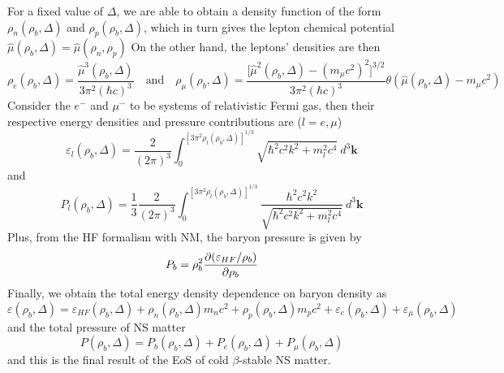 For a fixed value of $\Delta$, we are able to obtain a density function of the form $\rho_n (\rho_b, \Delta)$ and $\rho_p (\rho_b, \Delta)$, which in turn gives the lepton chemical potential $\hat{\mu}(\rho_b,\Delta) = \hat{\mu}(\rho_n,\rho_p)$ On the other hand, the leptons' densities are then
\begin{equation}
        \rho_e(\rho_b,\Delta) = \frac{ \hat{\mu}^3(\rho_b,\Delta)}{ 3\pi^2 (\hbar c)^3} \quad\text{and}\quad \rho_\mu(\rho_b,\Delta) = \frac{ \Big[\hat{\mu}^2(\rho_b,\Delta) - (m_\mu c^2)^2\Big]^{3/2}}{ 3\pi^2 (\hbar c)^3} \theta(\hat{\mu}(\rho_b,\Delta)-m_\mu c^2)
\end{equation} 
Consider the $e^-$ and $\mu^-$ to be systems of relativistic Fermi gas, then their respective energy densities and pressure contributions are ($l=e,\mu$)
\begin{equation}
        \varepsilon_l(\rho_b,\Delta) = \frac{ 2}{ (2\pi)^3} \int_{{0}}^{{[3\pi^2\rho_l(\rho_b,\Delta)]^{1/3}}} {\sqrt{\hbar^2 c^2 k^2 + m_l^2 c^4}} \: d^3{\mathbf{k}}
\end{equation} 
and
\begin{equation}
        P_l(\rho_b,\Delta) = \frac{ 1}{ 3} \frac{ 2}{ (2\pi)^3} \int_{{0}}^{{[3\pi^2 \rho_l(\rho_b,\Delta)]^{1/3}}} { \frac{ \hbar^2 c^2 k^2}{ \sqrt{\hbar^2 c^2 k^2 + m_l^2 c^4}} } \: d^3{\mathbf{k}}
\end{equation} 
Plus, from the \gls{HF} formalism with \gls{NM}, the baryon pressure is given by
\begin{equation}
        P_b = \rho_b^2 \pdv{(\varepsilon_{HF}/\rho_b)}{\rho_b}
\end{equation}
Finally, we obtain the total energy density dependence on baryon density as 
\begin{equation}
        \varepsilon(\rho_b,\Delta) = \varepsilon_{HF}(\rho_b,\Delta) + \rho_n(\rho_b,\Delta)m_n c^2 + \rho_p(\rho_b,\Delta)m_p c^2 + \varepsilon_e(\rho_b,\Delta) + \varepsilon_\mu(\rho_b,\Delta)
\end{equation}
and the total pressure of \gls{NS} matter
\begin{equation}
        P(\rho_b,\Delta) = P_b(\rho_b,\Delta) + P_e(\rho_b,\Delta) + P_\mu(\rho_b,\Delta)
\end{equation}
and this is the final result of the \gls{EoS} of cold $\beta$-stable \gls{NS} matter.
